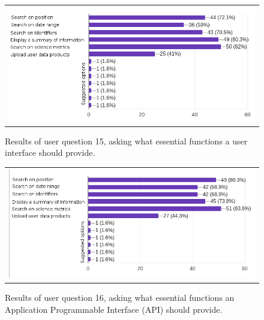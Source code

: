 \documentclass{article}
\begin{document}
\begin{figure}[ht]
\centering
\begin{tabular}{c}
\includegraphics[width=6in]{figures/user_question_15.png}
\end{tabular}
\caption{Results of user question 15, asking what essential functions a user interface should provide.}
\label{fig:broker_interactions4}
\end{figure}

\begin{figure}[ht]
\centering
\begin{tabular}{c}
\includegraphics[width=6in]{figures/user_question_16.png}
\end{tabular}
\caption{Results of user question 16, asking what essential functions an Application Programmable Interface (API) should provide.}
\label{fig:broker_interactions5}
\end{figure}
\end{document}
